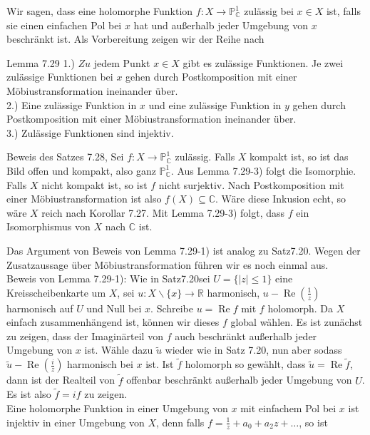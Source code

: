 \documentclass[10pt, letterpaper]{article}
\begin{document}
Wir sagen, dass eine holomorphe Funktion $f: X \longrightarrow \mathbb{P}_{\mathbb{C}}^{1}$ zulässig bei $x \in X$ ist, falls sie einen einfachen Pol bei $x$ hat und außerhalb jeder Umgebung von $x$ beschränkt ist. Als Vorbereitung zeigen wir der Reihe nach

Lemma 7.29 1.) $Z u$ jedem Punkt $x \in X$ gibt es zulässige Funktionen. Je zwei zulässige Funktionen bei $x$ gehen durch Postkomposition mit einer Möbiustransformation ineinander über.\\
2.) Eine zulässige Funktion in $x$ und eine zulässige Funktion in $y$ gehen durch Postkomposition mit einer Möbiustransformation ineinander über.\\
3.) Zulässige Funktionen sind injektiv.

Beweis des Satzes 7.28, Sei $f: X \longrightarrow \mathbb{P}_{\mathbb{C}}^{1}$ zulässig. Falls $X$ kompakt ist, so ist das Bild offen und kompakt, also ganz $\mathbb{P}_{\mathbb{C}}^{1}$. Aus Lemma 7.29-3) folgt die Isomorphie.\\
Falls $X$ nicht kompakt ist, so ist $f$ nicht surjektiv. Nach Postkomposition mit einer Möbiustransformation ist also $f(X) \subseteq \mathbb{C}$. Wäre diese Inkusion echt, so wäre $X$ reich nach Korollar 7.27. Mit Lemma 7.29-3) folgt, dass $f$ ein Isomorphismus von $X$ nach $\mathbb{C}$ ist.

Das Argument von Beweis von Lemma 7.29-1) ist analog zu Satz7.20. Wegen der Zusatzaussage über Möbiustransformation führen wir es noch einmal aus.\\
Beweis von Lemma 7.29-1): Wie in Satz7.20sei $U=\{|z| \leq 1\}$ eine Kreisscheibenkarte um $X$, sei $u: X \backslash\{x\} \rightarrow \mathbb{R}$ harmonisch, $u-\operatorname{Re}\left(\frac{1}{z}\right)$ harmonisch auf $U$ und Null bei $x$. Schreibe $u=\operatorname{Re} f$ mit $f$ holomorph. Da $X$ einfach zusammenhängend ist, können wir dieses $f$ global wählen. Es ist zunächst zu zeigen, dass der Imaginärteil von $f$ auch beschränkt außerhalb jeder Umgebung von $x$ ist. Wähle dazu $\widetilde{u}$ wieder wie in Satz 7.20, nun aber sodass $\widetilde{u}-\operatorname{Re}\left(\frac{i}{z}\right)$ harmonisch bei $x$ ist. Ist $\widetilde{f}$ holomorph so gewählt, dass $\widetilde{u}=\operatorname{Re} \widetilde{f}$, dann ist der Realteil von $\widetilde{f}$ offenbar beschränkt außerhalb jeder Umgebung von $U$. Es ist also $\widetilde{f}=i f$ zu zeigen.\\
Eine holomorphe Funktion in einer Umgebung von $x$ mit einfachem Pol bei $x$ ist injektiv in einer Umgebung von $X$, denn falls $f=\frac{1}{z}+a_{0}+a_{2} z+\ldots$, so ist
\end{document}
